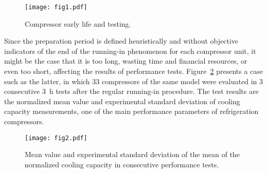 \documentclass[preprint,11pt,number]{elsarticle}
\begin{document}
\begin{figure}[!htb]
\begin{center}
\texttt{[image: fig1.pdf]}    %
\caption{Compressor early life and testing.} 
\label{fig:diagramaProducao}
\end{center}
\end{figure}

Since the preparation period is defined heuristically and without objective indicators of the end of the running-in phenomenon for each compressor unit, it might be the case that it is too long, wasting time and financial resources, or even too short, affecting the results of performance tests. Figure~\ref{fig:calorimetroNorm} presents a case such as the latter, in which 33 compressors of the same model were evaluated in 3 consecutive \SI{3}{\hour} tests after the regular running-in procedure. The test results are the normalized mean value and experimental standard deviation of cooling capacity measurements, one of the main performance parameters of refrigeration compressors. %


\begin{figure}[!htb]
\begin{center}
\texttt{[image: fig2.pdf]}    %
\caption{Mean value and experimental standard deviation of the mean of the normalized cooling capacity in consecutive performance tests.} 
\label{fig:calorimetroNorm}
\end{center}
\end{figure}
\end{document}
